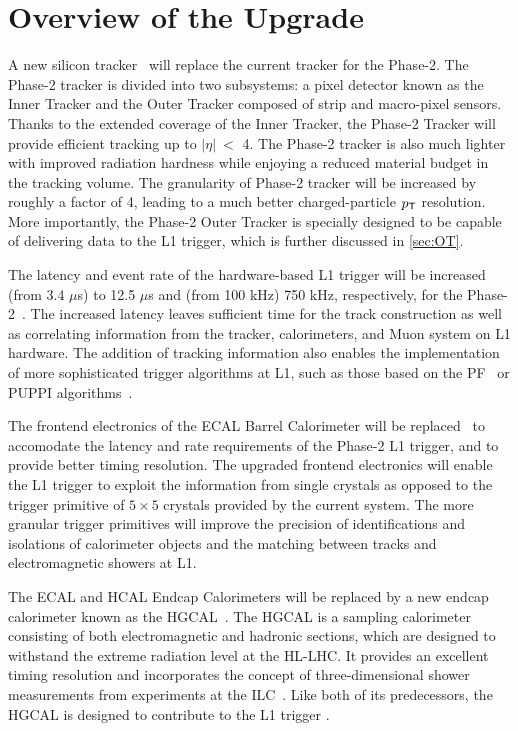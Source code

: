 \section{Overview of the Upgrade}
\label{sec:Overview}

A new silicon tracker~\cite{CMS:2017lum} will replace the current tracker for the Phase-2. The Phase-2 tracker is divided into two subsystems: a pixel detector known as the Inner Tracker and the Outer Tracker composed of strip and macro-pixel sensors. Thanks to the extended coverage of the Inner Tracker, the Phase-2 Tracker will provide efficient tracking up to $|\eta|~<$ 4. The Phase-2 tracker is also much lighter with improved radiation hardness while enjoying a reduced material budget in the tracking volume. The granularity of Phase-2 tracker will be increased by roughly a factor of 4, leading to a much better charged-particle $p_{\textsf{T}}$ resolution. More importantly, the Phase-2 Outer Tracker is specially designed to be capable of delivering data to the \ac{L1} trigger, which is further discussed in \autoref{sec:OT}.

The latency and event rate of the hardware-based \ac{L1} trigger will be increased (from 3.4 $\mu$s) to 12.5 $\mu$s and (from 100 kHz) 750 kHz, respectively, for the Phase-2~\cite{Zabi:2020gjd}. The increased latency leaves sufficient time for the track construction as well as correlating information from the tracker, calorimeters, and Muon system on \ac{L1} hardware. The addition of tracking information also enables the implementation of more sophisticated trigger algorithms at \ac{L1}, such as those based on the \ac{PF}~\cite{CMS:2017yfk} or \ac{PUPPI} algorithms~\cite{Bertolini:2014bba}.

The frontend electronics of the \ac{ECAL} Barrel Calorimeter will be replaced~\cite{ECAL:upgrade} to accomodate the latency and rate requirements of the Phase-2 \ac{L1} trigger, and to provide better timing resolution. The upgraded frontend electronics will enable the \ac{L1} trigger to exploit the information from single crystals as opposed to the trigger primitive of $5\times5$ crystals provided by the current system. The more granular trigger primitives will improve the precision of identifications and isolations of calorimeter objects and the matching between tracks and electromagnetic showers at \ac{L1}. 

The \ac{ECAL} and \ac{HCAL} Endcap Calorimeters will be replaced by a new endcap calorimeter known as the \ac{HGCAL}~\cite{CMS:2017jpq}. The \ac{HGCAL} is a sampling calorimeter consisting of both electromagnetic
and hadronic sections, which are designed to withstand the extreme radiation level at the \ac{HL-LHC}. It provides an excellent timing resolution and incorporates the concept of three-dimensional shower measurements from experiments at the \ac{ILC}~\cite{CALICE:2008kht}. Like both of its predecessors, the \ac{HGCAL} is designed to contribute to the \ac{L1} trigger .


